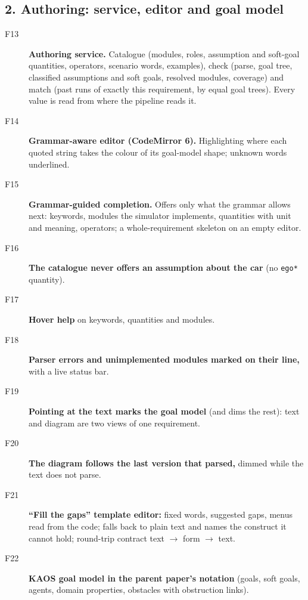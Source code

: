 \subsection*{2. Authoring: service, editor and goal model}

\begin{description}
\item[F13] \textbf{Authoring service.} Catalogue (modules, roles, assumption and soft-goal quantities, operators, scenario words, examples), check (parse, goal tree, classified assumptions and soft goals, resolved modules, coverage) and match (past runs of exactly this requirement, by equal goal trees). Every value is read from where the pipeline reads it. \tagnew{} 
\item[F14] \textbf{Grammar-aware editor (CodeMirror 6).} Highlighting where each quoted string takes the colour of its goal-model shape; unknown words underlined. \tagnew{} 
\item[F15] \textbf{Grammar-guided completion.} Offers only what the grammar allows next: keywords, modules the simulator implements, quantities with unit and meaning, operators; a whole-requirement skeleton on an empty editor. \tagnew{}
\item[F16] \textbf{The catalogue never offers an assumption about the car} (no \texttt{ego*} quantity). \tagnew{} 
\item[F17] \textbf{Hover help} on keywords, quantities and modules. \tagnew{}
\item[F18] \textbf{Parser errors and unimplemented modules marked on their line,} with a live status bar. \tagnew{}
\item[F19] \textbf{Pointing at the text marks the goal model} (and dims the rest): text and diagram are two views of one requirement. \tagnew{}
\item[F20] \textbf{The diagram follows the last version that parsed,} dimmed while the text does not parse. \tagnew{}
\item[F21] \textbf{``Fill the gaps'' template editor:} fixed words, suggested gaps, menus read from the code; falls back to plain text and names the construct it cannot hold; round-trip contract text $\rightarrow$ form $\rightarrow$ text. \tagnew{}
\item[F22] \textbf{KAOS goal model in the parent paper's notation} (goals, soft goals, agents, domain properties, obstacles with obstruction links). 

\end{description}

